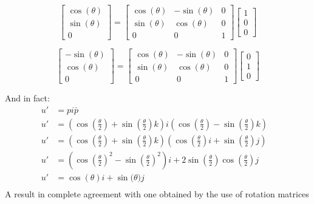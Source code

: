\noindent\begin{minipage}{.5\linewidth}
    \begin{equation}
        \begin{bmatrix}
            \cos{(\theta)} \\
            \sin{(\theta)} \\
            0
        \end{bmatrix} = \begin{bmatrix}
        \cos{(\theta)} & -\sin{(\theta)} & 0\\
        \sin{(\theta)} & \cos{(\theta)} & 0 \\
        0 & 0 & 1
        \end{bmatrix}
        \begin{bmatrix}
            1  \\ 0 \\ 0
        \end{bmatrix}
    \end{equation}
\end{minipage}
\begin{minipage}{.5\linewidth}
    \begin{equation}
             \begin{bmatrix}
            -\sin{(\theta)} \\
            \cos{(\theta)} \\
            0
        \end{bmatrix} = \begin{bmatrix}
        \cos{(\theta)} & -\sin{(\theta)} & 0\\
        \sin{(\theta)} & \cos{(\theta)} & 0\\
        0 & 0 & 1
        \end{bmatrix}
        \begin{bmatrix}
            0  \\ 1 \\ 0
        \end{bmatrix}
    \end{equation}
\end{minipage}
And in fact:
\begin{equation}
    \begin{aligned}
         u'&=pi\bar{p}&\mbox{}\\[1.25ex]
        u'&=(\cos{(\frac{\theta}{2})}+\sin{(\frac{\theta}{2})k})i(\cos{(\frac{\theta}{2})}-\sin{(\frac{\theta}{2})k})&\mbox{}\\[1.25ex]
        u'&=(\cos{(\frac{\theta}{2})}+\sin{(\frac{\theta}{2})k})(\cos{(\frac{\theta}{2})}i+\sin{(\frac{\theta}{2})}j)&\mbox{}\\[1.25ex]
        u'&=(\cos{(\frac{\theta}{2})}^{2}-\sin{(\frac{\theta}{2})}^{2})i + 2\sin{(\frac{\theta}{2})}\cos{(\frac{\theta}{2})}j&\mbox{}\\[1.25ex]
        u'&=\cos{(\theta)}i + \sin{(\theta})j&\mbox{}\\[1.25ex]

    \end{aligned}
\end{equation}
A result in complete agreement with one obtained by the use of rotation matrices

